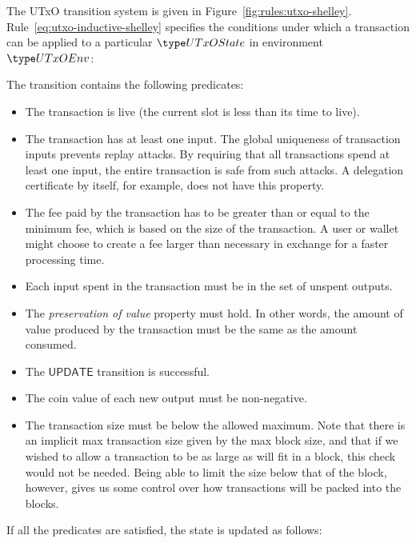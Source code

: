 The UTxO transition system is given in Figure~\ref{fig:rules:utxo-shelley}.
Rule~\ref{eq:utxo-inductive-shelley} specifies the conditions under which a transaction can
be applied to a particular $\UTxOState$ in environment $\UTxOEnv$:

The transition contains the following predicates:

\begin{itemize}
  \item
    The transaction is live (the current slot is less than its time to live).
  \item
    The transaction has at least one input.
    The global uniqueness of transaction inputs prevents replay attacks.
    By requiring that all transactions spend at least one input,
    the entire transaction is safe from such attacks.
    A delegation certificate by itself, for example, does not have this property.
  \item
    The fee paid by the transaction has to be greater than or equal to the minimum fee,
    which is based on the size of the transaction.
    A user or wallet might choose to create a fee larger than necessary
    in exchange for a faster processing time.
  \item
    Each input spent in the transaction must be in the set of unspent
    outputs.
  \item
    The \textit{preservation of value} property must hold.
    In other words, the amount of value produced by the transaction must be the same as
    the amount consumed.
  \item
    The $\mathsf{UPDATE}$ transition is successful.
  \item
    The coin value of each new output must be non-negative.
  \item
    The transaction size must be below the allowed maximum.
    Note that there is an implicit max transaction size given by the max block size,
    and that if we wished to allow a transaction to be as large as will fit in a block, this
    check would not be needed.
    Being able to limit the size below that of the block, however, gives us some
    control over how transactions will be packed into the blocks.
\end{itemize}
If all the predicates are satisfied, the state is updated as follows:

